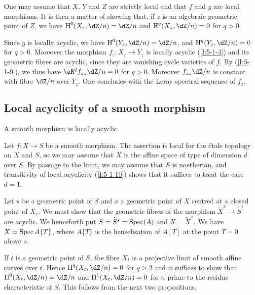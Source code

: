 One may assume that $X$, $Y$ and $Z$ are strictly local and that $f$ and $g$
are local morphisms. It is then a matter of showing that, if $z$ is an
algebraic geometric point of $Z$, we have $\h^0(X_z,\dZ/n) = \dZ/n$ and
$\h^q(X_z,\dZ/n) = 0$ for $q>0$.

Since $g$ is locally acyclic, we have $\h^0(Y_z,\dZ/n) = \dZ/n$, and
$\h^q(Y_z,\dZ/n) = 0$ for $q>0$. Moreover the morphism $f_z:X_z\to Y_z$ is
locally acyclic (\ref{I:5-1-4}) and its geometric fibres are
acyclic, since they are vanishing cycle varieties of $f$.
By (\ref{I:5-1-9}), we thus have $\eR^q {f_z}_*\dZ/n = 0$ for $q>0$. Moreover
${f_z}_*\dZ/n$ is constant with fibre $\dZ/n$ over $Y_z$. One concludes with
the Leray spectral sequence of $f_z$. 










\subsection{Local acyclicity of a smooth morphism}\label{I:5-2}





\begin{theorem}\label{I:5-2-1}
A smooth morphism is locally acyclic.
\end{theorem}

Let $f:X\to S$ be a smooth morphism. The assertion is local for the \'etale
topology on $X$ and $S$, so we may assume that $X$ is the affine space of
type of dimension $d$ over $S$. By passage to the limit, we may assume that $S$
is noetherian, and transitivity of local acyclicity (\ref{I:5-1-10}) shows
that it suffices to treat the case $d=1$.

Let $s$ be a geometric point of $S$ and $x$ a geometric point of
$X$ centred at a closed point of $X_s$. We must show that the geometric
fibres of the morphism $\widetilde X^x\to \widetilde S^s$ are
acyclic. We henceforth put $S=\widetilde S^s=\operatorname{Spec}(A)$ and
$X=\widetilde X^x$. We have $X\simeq \operatorname{Spec} A\{T\}$, where $A\{T\}$ is the
henselisation of $A[T]$ at the point $T=0$ above $s$.

If $t$ is a geometric point of $S$, the fibre $X_t$ is a projective limit
of smooth affine curves over $t$. Hence $\h^q(X_t,\dZ/n) = 0$
for $q\geqslant 2$ and it suffices to show that $\h^0(X_t,\dZ/n) = \dZ/n$ and
$\h^1(X_t,\dZ/n) = 0$ for $n$ prime to the residue characteristic of
$S$. This follows from the next two propositions. 





